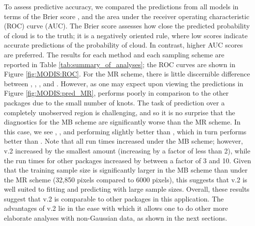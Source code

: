 \documentclass[article]{jss}
\begin{document}
To assess predictive accuracy, we compared the predictions from all models in terms of the Brier score \citep[Sec.~3]{Gneiting_2007_scoring_rules}, and the area under the receiver operating characteristic (ROC) curve (AUC). %
The Brier score assesses how close the predicted probability of cloud is to the truth; it is a negatively oriented rule, where low scores indicate accurate predictions of the probability of cloud.
In contrast, higher AUC scores are preferred.
The results for each method and each sampling scheme are reported in Table \ref{tab:summary_of_analyses}; the ROC curves are shown in Figure \ref{fig:MODIS:ROC}. 
For the MR scheme, there is little discernible difference between , , , and . 
 However, as one may expect upon viewing the predictions in Figure \ref{fig:MODIS:pred_MR},  performs poorly in comparison to the other packages due to the small number of knots. 
 The task of prediction over a completely unobserved region is challenging, and so it is no surprise that the diagnostics for the MB scheme are significantly worse than the MR scheme. 
 In this case, we see , , and  performing slightly better than , which in turn performs better than . 
 Note that all run times increased under the MB scheme; however,  v.2 increased by the smallest amount (increasing by a factor of less than 2), while the run times for other packages increased by between a factor of 3 and 10. 
 Given that the training sample size is significantly larger in the MB scheme than under the MR scheme (32,850 pixels compared to 6000 pixels), this suggests that  v.2 is well suited to fitting and predicting with large sample sizes.  
 Overall, these results suggest that  v.2 is comparable to other packages in this application. 
 The advantages of  v.2 lie in the ease with which it allows one to do other more elaborate analyses with non-Gaussian data, as shown in the next sections. 
 
 
\end{document}

